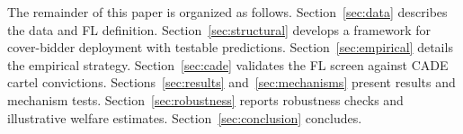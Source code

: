 The remainder of this paper is organized as follows.
Section~\ref{sec:data} describes the data and FL definition.
Section~\ref{sec:structural} develops a framework for cover-bidder
deployment with testable predictions. Section~\ref{sec:empirical}
details the empirical strategy. Section~\ref{sec:cade} validates the
FL screen against CADE cartel convictions. Sections~\ref{sec:results}
and~\ref{sec:mechanisms} present results and mechanism tests.
Section~\ref{sec:robustness} reports robustness checks and
illustrative welfare estimates.
Section~\ref{sec:conclusion} concludes.
